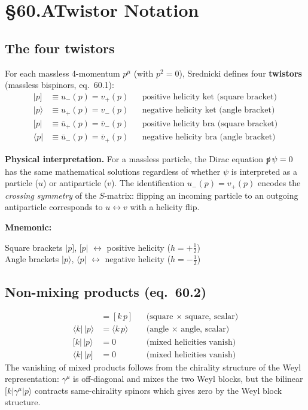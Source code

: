 \section{§60.A\quad Twistor Notation}

\subsection{The four twistors}

For each massless 4-momentum $p^\mu$ (with $p^2=0$), Srednicki defines
four \textbf{twistors} (massless bispinors, eq.~60.1):
\begin{align}
  |p] &\equiv u_-(p) = v_+(p)
  &&\text{positive helicity ket (square bracket)}
  \tag{60.1a}\\
  |p\rangle &\equiv u_+(p) = v_-(p)
  &&\text{negative helicity ket (angle bracket)}
  \tag{60.1b}\\
  [p| &\equiv \bar u_+(p) = \bar v_-(p)
  &&\text{positive helicity bra (square bracket)}
  \tag{60.1c}\\
  \langle p| &\equiv \bar u_-(p) = \bar v_+(p)
  &&\text{negative helicity bra (angle bracket)}
  \tag{60.1d}
\end{align}

\textbf{Physical interpretation.}
For a massless particle, the Dirac equation $\slashed{p}\,\psi=0$ has the same
mathematical solutions regardless of whether $\psi$ is interpreted as a particle
($u$) or antiparticle ($v$).  The identification $u_-(p)=v_+(p)$ encodes the
\emph{crossing symmetry} of the $S$-matrix: flipping an incoming particle to
an outgoing antiparticle corresponds to $u\leftrightarrow v$ with a helicity
flip.

\textbf{Mnemonic:}
\begin{center}
  Square brackets $|p]$, $[p|$ $\leftrightarrow$ positive helicity ($h=+\tfrac12$)\\[2pt]
  Angle brackets  $|p\rangle$, $\langle p|$ $\leftrightarrow$ negative helicity ($h=-\tfrac12$)
\end{center}

\subsection{Non-mixing products (eq.~60.2)}

\begin{align}
  [k|\,|p] &= [k\,p] && \text{(square × square, scalar)} \\
  \langle k|\,|p\rangle &= \langle k\,p\rangle && \text{(angle × angle, scalar)} \\
  [k|\,|p\rangle &= 0 && \text{(mixed helicities vanish)} \\
  \langle k|\,|p] &= 0 && \text{(mixed helicities vanish)}
\end{align}
The vanishing of mixed products follows from the chirality structure of the
Weyl representation: $\gamma^\mu$ is off-diagonal and mixes the two Weyl
blocks, but the bilinear $[k|\gamma^\mu|p\rangle$ contracts same-chirality
spinors which gives zero by the Weyl block structure.

